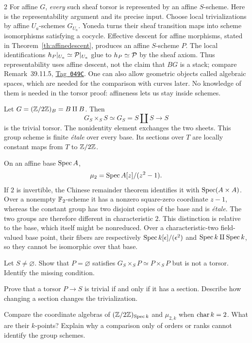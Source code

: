 \documentclass[12pt]{memoir}
\newcommand{\BGtag}[1]{\href{https://stacks.math.columbia.edu/tag/#1}{Tag~\texttt{#1}}}
\begin{document}
\begin{multicols}{2}
For affine $G$, \emph{every} such sheaf torsor is represented by an affine
$S$-scheme. Here is the representability argument and its precise input.
Choose local trivializations by affine $U_a$-schemes $G_{U_a}$. Yoneda
turns their sheaf transition maps into scheme isomorphisms satisfying a
cocycle. Effective descent for affine morphisms, stated in
Theorem~\ref{th:affinedescent}, produces an affine $S$-scheme $P$.
The local identifications $h_P|_{U_a}\simeq\mathcal{P}|_{U_a}$ glue to
$h_P\simeq\mathcal{P}$ by the sheaf axiom. Thus representability uses affine
descent, not the claim that $BG$ is a stack; compare Remark~39.11.5,
\BGtag{049C}. One can also allow geometric objects called algebraic
spaces, which are needed for the comparison with curves later.
No knowledge of them is needed in the torsor proof: affineness lets
us stay inside schemes.

\begin{Ex}\label{ex:trivialdouble}
Let $G=(\mathbb{Z}/2\mathbb{Z})_B=B\amalg B$. Then
\[
 G_S\times_S S\simeq G_S=S\amalg S\to S
\]
is the trivial torsor. The nonidentity element exchanges the two sheets.
This group scheme is finite \emph{\'etale} over every base. Its sections
over $T$ are locally constant maps from $T$ to $\mathbb{Z}/2\mathbb{Z}$.

On an affine base $\operatorname{Spec} A$,
\[
 \mu_2=\operatorname{Spec} A[z]/(z^2-1).
\]
If $2$ is invertible, the Chinese remainder theorem identifies it with
$\operatorname{Spec}(A\times A)$. Over a nonempty $\mathbb{F}_2$-scheme it has a nonzero
square-zero coordinate $z-1$, whereas the constant group has two disjoint
copies of the base and is \emph{\'etale}. The two groups are therefore
different in characteristic $2$. This distinction is relative to the
base, which itself might be nonreduced. Over a characteristic-two
field-valued base point, their fibers are respectively
$\operatorname{Spec} k[\epsilon]/(\epsilon^2)$ and
$\operatorname{Spec} k\amalg\operatorname{Spec} k$, so they cannot be isomorphic over that base.
\end{Ex}

\begin{Ej}\label{ex:empty}
Let $S\ne\varnothing$. Show that $P=\varnothing$ satisfies
$G_S\times_S P\simeq P\times_S P$ but is not a torsor. Identify the
missing condition.
\end{Ej}
\begin{Ej}\label{ex:section}
Prove that a torsor $P\to S$ is trivial if and only if it has a section.
Describe how changing a section changes the trivialization.
\end{Ej}
\begin{Ej}\label{ex:mu}
Compare the coordinate algebras of $(\mathbb{Z}/2\mathbb{Z})_{\operatorname{Spec} k}$ and
$\mu_{2,k}$ when $\operatorname{char} k=2$. What are their $k$-points? Explain why a
comparison only of orders or ranks cannot identify the group schemes.
\end{Ej}


\end{multicols}
\end{document}

